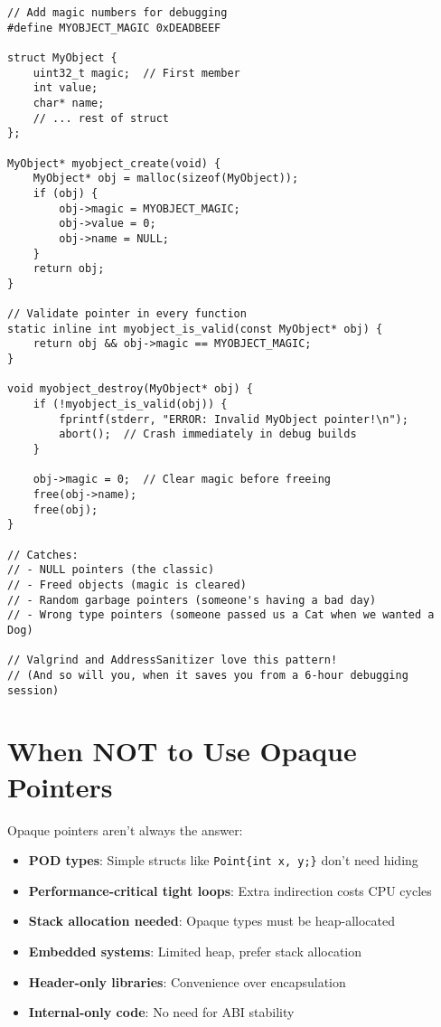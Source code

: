 \begin{lstlisting}
// Add magic numbers for debugging
#define MYOBJECT_MAGIC 0xDEADBEEF

struct MyObject {
    uint32_t magic;  // First member
    int value;
    char* name;
    // ... rest of struct
};

MyObject* myobject_create(void) {
    MyObject* obj = malloc(sizeof(MyObject));
    if (obj) {
        obj->magic = MYOBJECT_MAGIC;
        obj->value = 0;
        obj->name = NULL;
    }
    return obj;
}

// Validate pointer in every function
static inline int myobject_is_valid(const MyObject* obj) {
    return obj && obj->magic == MYOBJECT_MAGIC;
}

void myobject_destroy(MyObject* obj) {
    if (!myobject_is_valid(obj)) {
        fprintf(stderr, "ERROR: Invalid MyObject pointer!\n");
        abort();  // Crash immediately in debug builds
    }

    obj->magic = 0;  // Clear magic before freeing
    free(obj->name);
    free(obj);
}

// Catches:
// - NULL pointers (the classic)
// - Freed objects (magic is cleared)
// - Random garbage pointers (someone's having a bad day)
// - Wrong type pointers (someone passed us a Cat when we wanted a Dog)

// Valgrind and AddressSanitizer love this pattern!
// (And so will you, when it saves you from a 6-hour debugging session)
\end{lstlisting}

\section{When NOT to Use Opaque Pointers}

Opaque pointers aren't always the answer:

\begin{itemize}
    \item \textbf{POD types}: Simple structs like \texttt{Point\{int x, y;\}} don't need hiding
    \item \textbf{Performance-critical tight loops}: Extra indirection costs CPU cycles
    \item \textbf{Stack allocation needed}: Opaque types must be heap-allocated
    \item \textbf{Embedded systems}: Limited heap, prefer stack allocation
    \item \textbf{Header-only libraries}: Convenience over encapsulation
    \item \textbf{Internal-only code}: No need for ABI stability
\end{itemize}

